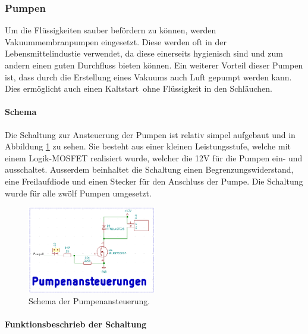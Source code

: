 \subsubsection{Pumpen}
\label{subsubsec:Pumpen}

Um die Flüssigkeiten sauber befördern zu können, werden Vakuummembranpumpen eingesetzt. Diese werden oft in der Lebensmittelindustie verwendet, da diese einerseits hygienisch sind und zum andern einen guten Durchfluss bieten können. Ein weiterer Vorteil dieser Pumpen ist, dass durch die Erstellung eines Vakuums auch Luft gepumpt werden kann. Dies ermöglicht auch einen \flqq Kaltstart\frqq\ ohne Flüssigkeit in den Schläuchen. \cite{aiyimaindustrial_store_us_nodate}

\paragraph{Schema}\mbox{}

Die Schaltung zur Ansteuerung der Pumpen ist relativ simpel aufgebaut und in Abbildung \ref{fig:Schema_Pumpenansteuerung} zu sehen. Sie besteht aus einer kleinen Leistungsstufe, welche mit einem Logik-MOSFET realisiert wurde, welcher die 12V für die Pumpen  ein- und ausschaltet. Ausserdem beinhaltet die Schaltung einen Begrenzungswiderstand, eine Freilaufdiode und einen Stecker für den Anschluss der Pumpe. Die Schaltung wurde für alle zwölf Pumpen umgesetzt. \cite{aiyimaindustrial_store_us_nodate}

\begin{figure}[h!]
	\centering
	\includegraphics[width=0.5\textwidth]{graphics/Schema_Pumpenansteuerung.png}
	\caption{Schema der Pumpenansteuerung.}
	\label{fig:Schema_Pumpenansteuerung}
\end{figure}

\paragraph{Funktionsbeschrieb der Schaltung}\mbox{}

